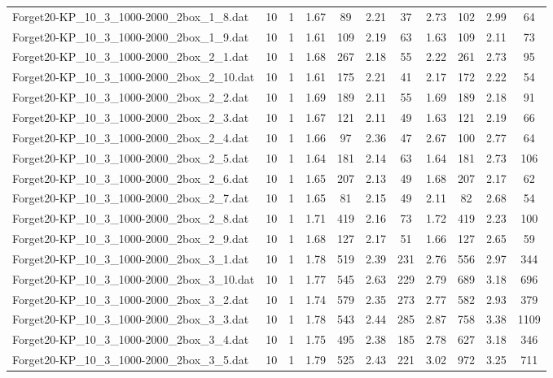 \begin{table}[!ht]
\begin{tabular}{lcccccccccc}
Forget20-KP\_10\_3\_1000-2000\_2box\_1\_8.dat & 10 & 1 & 1.67 & 89 & 2.21 & 37 & 2.73 & 102 & 2.99 & 64 \\
Forget20-KP\_10\_3\_1000-2000\_2box\_1\_9.dat & 10 & 1 & 1.61 & 109 & 2.19 & 63 & 1.63 & 109 & 2.11 & 73 \\
Forget20-KP\_10\_3\_1000-2000\_2box\_2\_1.dat & 10 & 1 & 1.68 & 267 & 2.18 & 55 & 2.22 & 261 & 2.73 & 95 \\
Forget20-KP\_10\_3\_1000-2000\_2box\_2\_10.dat & 10 & 1 & 1.61 & 175 & 2.21 & 41 & 2.17 & 172 & 2.22 & 54 \\
Forget20-KP\_10\_3\_1000-2000\_2box\_2\_2.dat & 10 & 1 & 1.69 & 189 & 2.11 & 55 & 1.69 & 189 & 2.18 & 91 \\
Forget20-KP\_10\_3\_1000-2000\_2box\_2\_3.dat & 10 & 1 & 1.67 & 121 & 2.11 & 49 & 1.63 & 121 & 2.19 & 66 \\
Forget20-KP\_10\_3\_1000-2000\_2box\_2\_4.dat & 10 & 1 & 1.66 & 97 & 2.36 & 47 & 2.67 & 100 & 2.77 & 64 \\
Forget20-KP\_10\_3\_1000-2000\_2box\_2\_5.dat & 10 & 1 & 1.64 & 181 & 2.14 & 63 & 1.64 & 181 & 2.73 & 106 \\
Forget20-KP\_10\_3\_1000-2000\_2box\_2\_6.dat & 10 & 1 & 1.65 & 207 & 2.13 & 49 & 1.68 & 207 & 2.17 & 62 \\
Forget20-KP\_10\_3\_1000-2000\_2box\_2\_7.dat & 10 & 1 & 1.65 & 81 & 2.15 & 49 & 2.11 & 82 & 2.68 & 54 \\
Forget20-KP\_10\_3\_1000-2000\_2box\_2\_8.dat & 10 & 1 & 1.71 & 419 & 2.16 & 73 & 1.72 & 419 & 2.23 & 100 \\
Forget20-KP\_10\_3\_1000-2000\_2box\_2\_9.dat & 10 & 1 & 1.68 & 127 & 2.17 & 51 & 1.66 & 127 & 2.65 & 59 \\
Forget20-KP\_10\_3\_1000-2000\_2box\_3\_1.dat & 10 & 1 & 1.78 & 519 & 2.39 & 231 & 2.76 & 556 & 2.97 & 344 \\
Forget20-KP\_10\_3\_1000-2000\_2box\_3\_10.dat & 10 & 1 & 1.77 & 545 & 2.63 & 229 & 2.79 & 689 & 3.18 & 696 \\
Forget20-KP\_10\_3\_1000-2000\_2box\_3\_2.dat & 10 & 1 & 1.74 & 579 & 2.35 & 273 & 2.77 & 582 & 2.93 & 379 \\
Forget20-KP\_10\_3\_1000-2000\_2box\_3\_3.dat & 10 & 1 & 1.78 & 543 & 2.44 & 285 & 2.87 & 758 & 3.38 & 1109 \\
Forget20-KP\_10\_3\_1000-2000\_2box\_3\_4.dat & 10 & 1 & 1.75 & 495 & 2.38 & 185 & 2.78 & 627 & 3.18 & 346 \\
Forget20-KP\_10\_3\_1000-2000\_2box\_3\_5.dat & 10 & 1 & 1.79 & 525 & 2.43 & 221 & 3.02 & 972 & 3.25 & 711 \\

\end{tabular}
\end{table}
